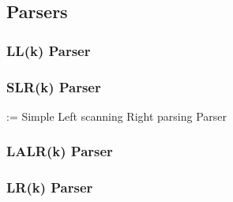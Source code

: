 \subsection{Parsers}

\subsubsection{LL(k) Parser}

\subsubsection{SLR(k) Parser}
:= Simple Left scanning Right parsing Parser


\subsubsection{LALR(k) Parser}

\subsubsection{LR(k) Parser}

